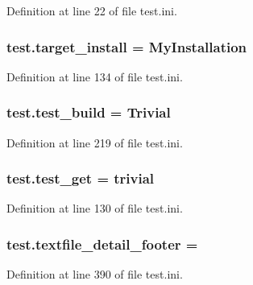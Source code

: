 Definition at line 22 of file test.\-ini.

\hypertarget{namespacetest_a567f95611fb12515b764d829ae44aabb}{
\subsubsection[{target\-\_\-install}]{\setlength{\rightskip}{0pt plus 5cm}test.\-target\-\_\-install = My\-Installation}}\label{namespacetest_a567f95611fb12515b764d829ae44aabb}


Definition at line 134 of file test.\-ini.

\hypertarget{namespacetest_aec036affe0d08e5c43462900a6548769}{
\subsubsection[{test\-\_\-build}]{\setlength{\rightskip}{0pt plus 5cm}test.\-test\-\_\-build = Trivial}}\label{namespacetest_aec036affe0d08e5c43462900a6548769}


Definition at line 219 of file test.\-ini.

\hypertarget{namespacetest_aed30062928699cb82ebdc01629cc1ec2}{
\subsubsection[{test\-\_\-get}]{\setlength{\rightskip}{0pt plus 5cm}test.\-test\-\_\-get = trivial}}\label{namespacetest_aed30062928699cb82ebdc01629cc1ec2}


Definition at line 130 of file test.\-ini.

\hypertarget{namespacetest_a26400b6c12ab57d038c2ecc468f19645}{
\subsubsection[{textfile\-\_\-detail\-\_\-footer}]{\setlength{\rightskip}{0pt plus 5cm}test.\-textfile\-\_\-detail\-\_\-footer =}}\label{namespacetest_a26400b6c12ab57d038c2ecc468f19645}


Definition at line 390 of file test.\-ini.


